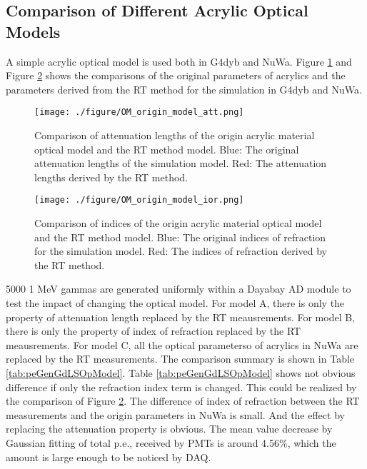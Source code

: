 \subsection{Comparison of Different Acrylic Optical Models}

A simple acrylic optical model is used both in G4dyb and NuWa. Figure \ref{fig:OM_origin_model_att.png} and
Figure \ref{fig:OM_origin_model_ior.png} shows the comparisons of the original parameters of acrylics
and the parameters derived from the RT method for the simulation in G4dyb and NuWa.


\begin{figure}
    \centering
    \texttt{[image: ./figure/OM\_origin\_model\_att.png]}
    \caption[Comparison of attenuation length of the origin acrylic material optical model and the RT method model]
{
Comparison of attenuation lengths of the origin acrylic material optical model and the RT method model.
Blue: The original attenuation lengths of the simulation model.
Red: The attenuation lengths derived by the RT method.
}
    \label{fig:OM_origin_model_att.png}
    \end{figure}

\begin{figure}
    \centering
    \texttt{[image: ./figure/OM\_origin\_model\_ior.png]}
    \caption[Comparison of indices of the origin acrylic material optical model and the RT method model]
{
Comparison of indices of the origin acrylic material optical model and the RT method model.
Blue: The original indices of refraction for the simulation model.
Red: The indices of refraction derived by the RT method.
}
    \label{fig:OM_origin_model_ior.png}
    \end{figure}


5000 1 MeV gammas are generated uniformly within a Dayabay AD module to test the impact of changing the optical model.
For model A, there is only the property of attenuation length replaced by the RT meausrements.
For model B, there is only the property of index of refraction replaced by the RT meausrements.
For model C, all the optical parameterso of acrylics in NuWa are replaced by the RT measurements.
The comparison summary is shown in Table \ref{tab:peGenGdLSOpModel}.
Table \ref{tab:peGenGdLSOpModel} shows not obvious difference if only the refraction index term is changed.
This could be realized by the comparison of Figure \ref{fig:OM_origin_model_ior.png}. The difference of index of
refraction between the RT measurements and the origin parameters in NuWa is small.
And the effect by replacing the attenuation property is obvious. The mean value decrease by Gaussian fitting of total p.e., received by PMTs
is around 4.56\%, which the amount is large enough to be noticed by DAQ.


